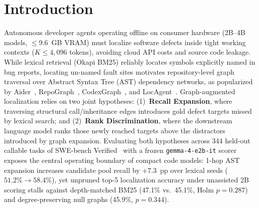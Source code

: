 \documentclass[10pt]{article}
\begin{document}
\section{Introduction}
\label{sec:intro}
Autonomous developer agents operating offline on consumer hardware (2B--4B models, $\le 9.6$~GB VRAM) must localize software defects inside tight working contexts ($K \le 4,096$ tokens), avoiding cloud API costs and source code leakage. While lexical retrieval (Okapi BM25) reliably locates symbols explicitly named in bug reports, locating un-named fault sites motivates repository-level graph traversal over Abstract Syntax Tree (AST) dependency networks, as popularized by Aider~\cite{gauthier2023aider}, RepoGraph~\cite{ouyang2025repograph}, CodexGraph~\cite{liu2025codexgraph}, and LocAgent~\cite{chen2025locagent}.
Graph-augmented localization relies on two joint hypotheses: (1)~\textbf{Recall Expansion}, where traversing structural call/inheritance edges introduces gold defect targets missed by lexical search; and (2)~\textbf{Rank Discrimination}, where the downstream language model ranks those newly reached targets above the distractors introduced by graph expansion. Evaluating both hypotheses across 344 held-out callable tasks of SWE-bench Verified~\cite{jimenez2024swebench} with a frozen \texttt{gemma-4-e2b-it} scorer exposes the central operating boundary of compact code models: 1-hop AST expansion increases candidate pool recall by $+7.3$~pp over lexical seeds ($51.2\% \to 58.4\%$), yet unpruned top-5 localization accuracy under unassisted 2B scoring stalls against depth-matched BM25 (47.1\% vs.\ 45.1\%, Holm $p=0.287$) and degree-preserving null graphs (45.9\%, $p=0.344$).
\end{document}
